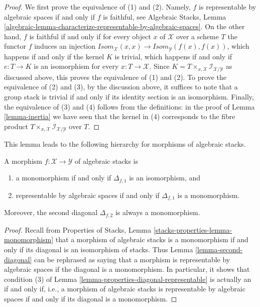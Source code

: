\begin{proof}
We first prove the equivalence of (1) and (2).
Namely, $f$ is representable by algebraic spaces if and only if $f$ is
faithful, see
Algebraic Stacks,
Lemma \ref{algebraic-lemma-characterize-representable-by-algebraic-spaces}.
On the other hand, $f$ is faithful if and only if for every object $x$
of $\mathcal{X}$ over a scheme $T$ the functor $f$ induces an injection
$\mathit{Isom}_\mathcal{X}(x, x) \to
\mathit{Isom}_\mathcal{Y}(f(x), f(x))$,
which happens if and only if the kernel $K$ is trivial, which happens if and
only if $e : T \to K$ is an isomorphism for every $x : T \to \mathcal{X}$.
Since $K = T \times_{x, \mathcal{X}} \mathcal{I}_{\mathcal{X}/\mathcal{Y}}$
as discussed above, this proves the equivalence of (1) and (2). To prove
the equivalence of (2) and (3), by the discussion above, it suffices to
note that a group stack is trivial if and only if its identity section
is an isomorphism. Finally, the equivalence of (3) and (4) follows
from the definitions: in the proof of Lemma \ref{lemma-inertia}
we have seen that the kernel in (4) corresponds to the fibre product
$T \times_{x, \mathcal{X}} \mathcal{I}_{\mathcal{X}/\mathcal{Y}}$ over $T$.
\end{proof}

\noindent
This lemma leads to the following hierarchy for
morphisms of algebraic stacks.

\begin{lemma}
\label{lemma-hierarchy}
A morphism $f : \mathcal{X} \to \mathcal{Y}$ of algebraic stacks is
\begin{enumerate}
\item a monomorphism if and only if $\Delta_{f, 1}$ is an isomorphism, and
\item representable by algebraic spaces if and only if $\Delta_{f, 1}$
is a monomorphism.
\end{enumerate}
Moreover, the second diagonal $\Delta_{f, 2}$ is always a monomorphism.
\end{lemma}

\begin{proof}
Recall from Properties of Stacks, Lemma
\ref{stacks-properties-lemma-monomorphism}
that a morphism of algebraic stacks is a monomorphism
if and only if its diagonal is an isomorphism of stacks.
Thus Lemma \ref{lemma-second-diagonal}
can be rephrased as saying that a morphism is
representable by algebraic spaces if the diagonal
is a monomorphism. In particular, it shows that condition
(3) of Lemma \ref{lemma-properties-diagonal-representable}
is actually an if and only if, i.e., a morphism of algebraic stacks
is representable by algebraic spaces if and only if
its diagonal is a monomorphism.
\end{proof}

